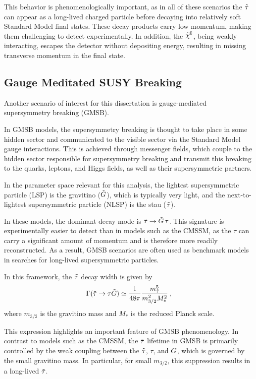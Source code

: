 This behavior is phenomenologically important, as in all of these scenarios the $\tilde{\tau}$ can appear as a long-lived charged particle before decaying into relatively soft Standard Model final states. These decay products carry low momentum, making them challenging to detect experimentally. In addition, the $\nino$, being weakly interacting, escapes the detector without depositing energy, resulting in missing transverse momentum in the final state.




\subsection{Gauge Meditated SUSY Breaking}
\label{sec:GMSB}
Another scenario of interest for this dissertation is gauge-mediated supersymmetry breaking (GMSB).

In GMSB models, the supersymmetry breaking is thought to take place in some hidden sector and communicated to the visible sector via the Standard Model gauge interactions. This is achieved through messenger fields, which couple to the hidden sector responsible for supersymmetry breaking and transmit this breaking to the quarks, leptons, and Higgs fields, as well as their supersymmetric partners.

In the parameter space relevant for this analysis, the lightest supersymmetric particle (LSP) is the gravitino ($\tilde{G}$), which is typically very light, and the next-to-lightest supersymmetric particle (NLSP) is the stau ($\tilde{\tau}$).

In these models, the dominant decay mode is $\tilde{\tau} \to \tilde{G} \, \tau$. This signature is experimentally easier to detect than in models such as the CMSSM, as the $\tau$ can carry a significant amount of momentum and is therefore more readily reconstructed. As a result, GMSB scenarios are often used as benchmark models in searches for long-lived supersymmetric particles.

In this framework, the $\tilde{\tau}$ decay width is given by~\cite{Fujii_2002}
\begin{equation}
 \Gamma(\tilde{\tau} \to \tau \tilde{G})\simeq \frac{1}{48\pi}\frac{m_{\tilde{\tau}}^5}{m_{3/2}^2 M_*^2}\,,
\label{eq:NLSP-decay-width}
\end{equation}
where $m_{3/2}$ is the gravitino mass and $M_*$ is the reduced Planck scale.

This expression highlights an important feature of GMSB phenomenology. In contrast to models such as the CMSSM, the $\tilde{\tau}$ lifetime in GMSB is primarily controlled by the weak coupling between the $\tilde{\tau}$, $\tau$, and $\tilde{G}$, which is governed by the small gravitino mass. In particular, for small $m_{3/2}$, this suppression results in a long-lived $\tilde{\tau}$.

